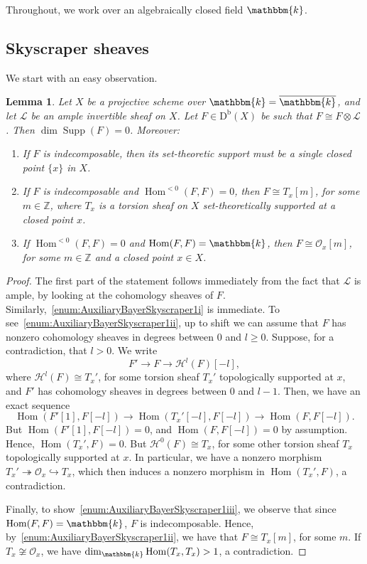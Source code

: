\documentclass[11pt, reqno]{amsart}
\numberwithin{equation}{section}
\theoremstyle{plain}
\newtheorem{lemma}[theorem]{Lemma}
\theoremstyle{remark}
\theoremstyle{definition}
\theoremstyle{italicsname}
\newcommand{\Db}{\mathrm{D^b}}
\DeclareMathOperator{\Hom}{Hom}
\newcommand{\cO}{\mathcal{O}}
\newcommand{\cH}{\mathcal{H}}
\newcommand{\cL}{\mathcal{L}}
\newcommand{\KK}{\mathbbm{k}}
\def\ZZ{\ensuremath{\mathbb{Z}}}
\begin{document}
Throughout, we work over an algebraically closed field $\KK$.

\subsection{Skyscraper sheaves}
We start with an easy observation.

\begin{lemma}\label{lem:AuxiliaryBayerSkyscraper1}
Let $X$ be a projective scheme over $\KK=\overline{\KK}$, and let $\cL$ be an ample invertible sheaf on $X$.
Let $F\in\Db(X)$ be such that $F\cong F\otimes\cL$.
Then $\dim\operatorname{Supp}(F)=0$.
Moreover:
\begin{enumerate}[{\rm (1)}]
    \item\label{enum:AuxiliaryBayerSkyscraper1i} If $F$ is indecomposable, then its set-theoretic support must be a single closed point $\{x\}$ in $X$.
    \item\label{enum:AuxiliaryBayerSkyscraper1ii} If $F$ is indecomposable and $\Hom^{<0}(F,F)=0$, then $F\cong T_x[m]$, for some $m\in\ZZ$, where $T_x$ is a torsion sheaf on $X$ set-theoretically supported at a closed point $x$.
    \item\label{enum:AuxiliaryBayerSkyscraper1iii} If $\Hom^{<0}(F,F)=0$ and $\Hom(F,F)=\KK$, then $F\cong\cO_x[m]$, for some $m\in\ZZ$ and a closed point $x\in X$.
\end{enumerate}
\end{lemma}

\begin{proof}
The first part of the statement follows immediately from the fact that $\cL$ is ample, by looking at the cohomology sheaves of $F$.
Similarly,~\ref{enum:AuxiliaryBayerSkyscraper1i} is immediate.
To see~\ref{enum:AuxiliaryBayerSkyscraper1ii}, up to shift we can assume that $F$ has nonzero cohomology sheaves in degrees between $0$ and $l\geq0$.
Suppose, for a contradiction, that $l>0$.
We write
\[
F'\longrightarrow F\longrightarrow \cH^l(F)[-l],
\]
where $\cH^l(F)\cong T_x'$, for some torsion sheaf $T_x'$ topologically supported at $x$, and $F'$ has cohomology sheaves in degrees between $0$ and $l-1$.
Then, we have an exact sequence
\[
\Hom(F'[1],F[-l])\longrightarrow\Hom(T_x'[-l],F[-l])\longrightarrow\Hom(F,F[-l]). 
\]
But $\Hom(F'[1],F[-l])=0$, and $\Hom(F,F[-l])=0$ by assumption.
Hence, $\Hom(T_x',F)=0$.
But $\cH^0(F)\cong T_x$, for some other torsion sheaf $T_x$ topologically supported at $x$. In particular, we have a nonzero morphism $T_x'\twoheadrightarrow\cO_x\hookrightarrow T_x$, which then induces a nonzero morphism in $\Hom(T_x',F)$, a contradiction.

Finally, to show~\ref{enum:AuxiliaryBayerSkyscraper1iii}, we observe that since $\Hom(F,F)=\KK$, $F$ is indecomposable. Hence, by~\ref{enum:AuxiliaryBayerSkyscraper1ii}, we have that $F\cong T_x[m]$, for some $m$. If $T_x\not\cong\cO_x$, we have $\dim_\KK\Hom(T_x,T_x)>1$, a contradiction. 
\end{proof}
\end{document}
